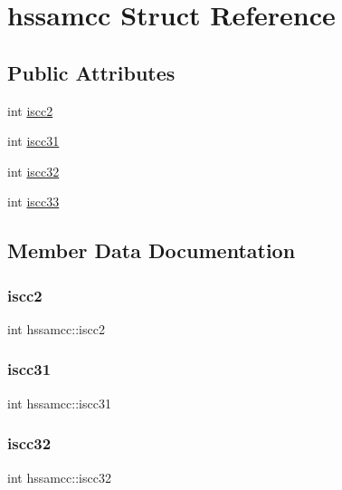 \hypertarget{structhssamcc}{}\section{hssamcc Struct Reference}
\label{structhssamcc}
\subsection*{Public Attributes}
\begin{DoxyCompactItemize}
\item 
int \hyperlink{structhssamcc_a895877b33bef3f406360e5be7a3b551f}{iscc2}
\item 
int \hyperlink{structhssamcc_a5bdc97dd4f11c4c1cfe07532eeb518df}{iscc31}
\item 
int \hyperlink{structhssamcc_ade7ea5ec1f9ed8b8cc98440c80b852a6}{iscc32}
\item 
int \hyperlink{structhssamcc_a6e7421eda9a06372741b8b6d1421ef27}{iscc33}
\end{DoxyCompactItemize}


\subsection{Member Data Documentation}
\mbox{\label{structhssamcc_a895877b33bef3f406360e5be7a3b551f}} 
\subsubsection{\texorpdfstring{iscc2}{iscc2}}
{\footnotesize\ttfamily int hssamcc\+::iscc2}

\mbox{\label{structhssamcc_a5bdc97dd4f11c4c1cfe07532eeb518df}} 
\subsubsection{\texorpdfstring{iscc31}{iscc31}}
{\footnotesize\ttfamily int hssamcc\+::iscc31}

\mbox{\label{structhssamcc_ade7ea5ec1f9ed8b8cc98440c80b852a6}} 
\subsubsection{\texorpdfstring{iscc32}{iscc32}}
{\footnotesize\ttfamily int hssamcc\+::iscc32}

